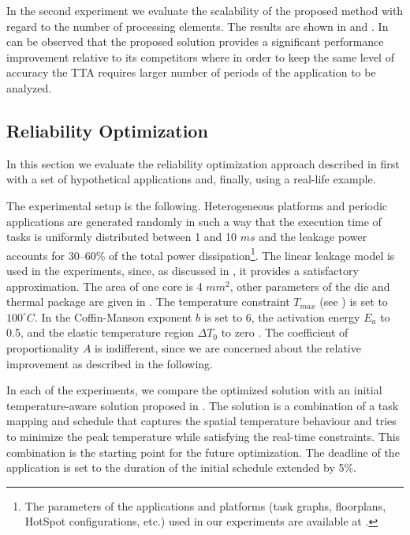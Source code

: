 In the second experiment we evaluate the scalability of the proposed method with regard to the number of processing elements. The results are shown in  and . In can be observed that the proposed solution provides a significant performance improvement relative to its competitors where in order to keep the same level of accuracy the TTA requires larger number of periods of the application to be analyzed.

\subsection{Reliability Optimization} \label{sec:reliability-results}
In this section we evaluate the reliability optimization approach described in  first with a set of hypothetical applications and, finally, using a real-life example.

The experimental setup is the following. Heterogeneous platforms and periodic applications are generated randomly \cite{dick1998} in such a way that the execution time of tasks is uniformly distributed between 1 and 10 $ms$ and the leakage power accounts for 30--60\% of the total power dissipation\footnote{The parameters of the applications and platforms (task graphs, floorplans, HotSpot configurations, etc.) used in our experiments are available at \cite{liu2011}.}. The linear leakage model is used in the experiments, since, as discussed in , it provides a satisfactory approximation. The area of one core is 4 $mm^2$, other parameters of the die and thermal package are given in . The temperature constraint $T_{max}$ (see ) is set to $100^\circ C$. In  the Coffin-Manson exponent $b$ is set to 6, the activation energy $E_a$ to 0.5, and the elastic temperature region $\Delta T_0$ to zero \cite{jedec2010}. The coefficient of proportionality $A$ is indifferent, since we are concerned about the relative improvement as described in the following.

In each of the experiments, we compare the optimized solution with an initial temperature-aware solution proposed in \cite{xie2006}. The solution is a combination of a task mapping and schedule that captures the spatial temperature behaviour and tries to minimize the peak temperature while satisfying the real-time constraints. This combination is the starting point for the future optimization. The deadline of the application is set to the duration of the initial schedule extended by 5\%.

